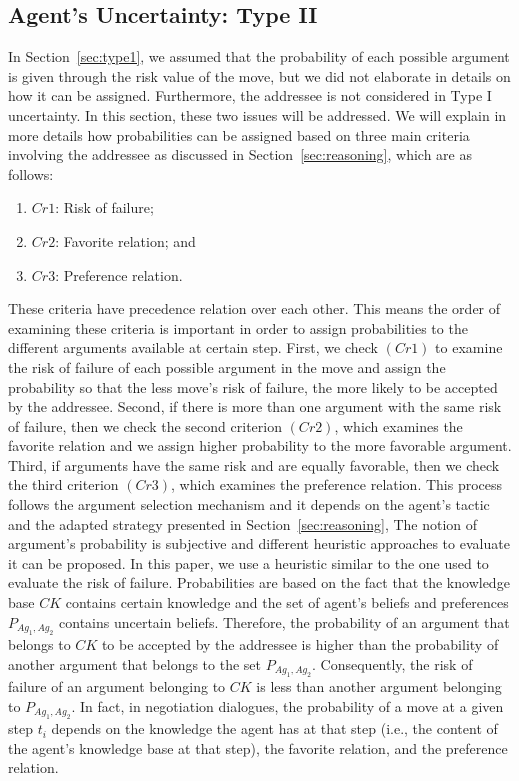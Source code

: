\subsection{Agent's Uncertainty: Type II}\label{sec:type2}
In Section~\ref{sec:type1}, we assumed that the probability of each possible argument is given through the risk value of the
move, but we did not elaborate in details on how it can be assigned. Furthermore, the addressee is not considered in Type I
uncertainty.
In this section, these two issues will be addressed. We will explain in more details how probabilities can be assigned based on
three main criteria involving the addressee as discussed in  Section~\ref{sec:reasoning}, which are as follows:
\begin{enumerate}
  \item $Cr1$: Risk of failure;
  \item $Cr2$: Favorite relation; and
  \item $Cr3$: Preference relation.
\end{enumerate}

These criteria have precedence relation over each other. This means the order of examining these criteria is important in order
to assign probabilities to the different arguments available at certain step. First, we check $(Cr1)$ to examine the risk of
failure of each possible argument in the move and assign the probability so that the less move's risk of failure, the more
likely to be accepted by the addressee. Second, if there is more than one argument with the same risk of failure, then we check the
second criterion $(Cr2)$, which examines the favorite relation and we assign higher probability to the more favorable argument.
Third, if arguments have the same risk and are equally favorable, then we check the third criterion $(Cr3)$, which examines the
preference relation. This process follows the argument selection mechanism and it depends on the agent's tactic and
the adapted strategy presented in Section~\ref{sec:reasoning},
The notion of argument's probability is subjective and different heuristic approaches to evaluate it can be proposed. In this
paper, we use a heuristic similar to the one used to evaluate the risk of failure. Probabilities are based on the fact that the
knowledge base $CK$ contains certain knowledge and the set of agent's beliefs and preferences $P_{Ag_1,Ag_2}$ contains uncertain
beliefs. Therefore, the probability of an argument that belongs to $CK$ to be accepted by the addressee is higher than the
probability of another argument that belongs to the set $P_{Ag_1,Ag_2}$. Consequently, the risk of failure of an argument
belonging to $CK$ is less than another argument belonging to $P_{Ag_1,Ag_2}$. In fact, in negotiation dialogues, the
probability of a move at a given step $t_i$ depends on the knowledge the agent has at that step (i.e., the content of the
agent's knowledge base at that step), the favorite relation, and the preference relation.

